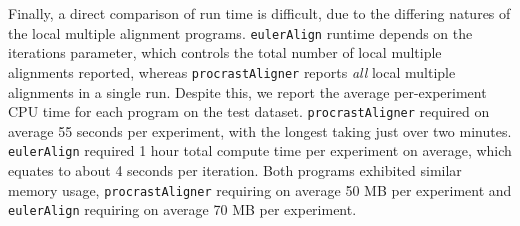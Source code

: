 \documentclass{llncs}
\begin{document}
Finally, a direct comparison of run time is difficult, due to the differing natures of the local multiple alignment programs.  \texttt{eulerAlign} runtime depends on the iterations parameter, which controls the total number of local multiple alignments reported, whereas \texttt{procrastAligner} reports \textit{all} local multiple alignments in a single run.  Despite this, we report the average per-experiment CPU time for each program on the test dataset. \texttt{procrastAligner} required on average 55 seconds per experiment, with the longest taking just over two minutes. \texttt{eulerAlign} required 1 hour total compute time per experiment on average, which equates to about 4 seconds per iteration.  Both programs exhibited similar memory usage, \texttt{procrastAligner} requiring on average 50 MB per experiment and \texttt{eulerAlign} requiring on average 70 MB per experiment.
\end{document}
